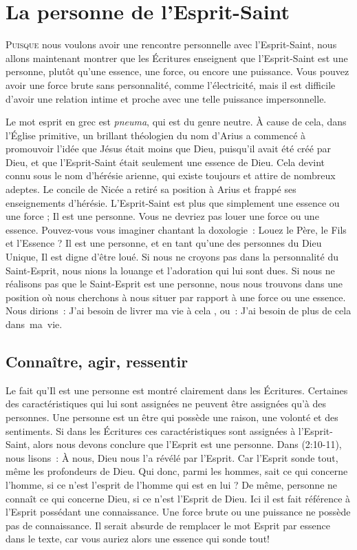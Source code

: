 \chapter{La personne de l'Esprit-Saint}

\lettrine{P}{uisque} nous voulons avoir une rencontre personnelle avec
 l'Esprit-Saint, nous allons maintenant montrer que les Écritures enseignent
 que l'Esprit-Saint est une personne, plutôt qu'une essence, une force, ou
 encore une puissance. Vous pouvez avoir une force brute sans personnalité,
 comme l'électricité, mais il est difficile d'avoir une relation intime et
 proche avec une telle puissance impersonnelle.

Le mot \og esprit \fg{} en grec est \emph{pneuma}, qui est du genre neutre.
 À cause de cela, dans l'Église primitive, un brillant théologien du nom
 d'Arius a commencé à promouvoir l'idée que Jésus était moins que Dieu,
 puisqu'il avait été créé par Dieu, et que l'Esprit-Saint était seulement
 une \og essence \fg{} de Dieu. Cela devint connu sous le nom d'hérésie
 arienne, qui existe toujours et attire de nombreux adeptes. Le concile de
 Nicée a retiré sa position à Arius et frappé ses enseignements d'hérésie.
 L'Esprit-Saint est plus que simplement une essence ou une force ; Il est
 une personne. Vous ne devriez pas louer une force ou une essence.
 Pouvez-vous vous imaginer chantant la doxologie~:
 \og Louez le Père, le Fils et l'Essence \fg{} ?
 Il est une personne, et en tant qu'une des personnes
 du Dieu Unique, Il est digne d'être loué. Si nous ne croyons pas dans la
 personnalité du Saint-Esprit, nous nions la louange et l'adoration qui lui
 sont dues. Si nous ne réalisons pas que le Saint-Esprit est une personne,
 nous nous trouvons dans une position où nous cherchons à nous situer par
 rapport à une force ou une essence. Nous dirions~: \og J'ai besoin de livrer
 ma vie à cela \fg{}, ou~: \og J'ai besoin de plus de cela dans~ma~vie.\fg


\section{Conna\^itre, agir, ressentir}

Le fait qu'Il est une personne est montré clairement dans les Écritures.
 Certaines des caractéristiques qui lui sont assignées ne peuvent être assignées
 qu'à des personnes. Une personne est un être qui possède une raison,
 une volonté et des sentiments.
 Si dans les Écritures ces caractéristiques sont assignées à
 l'Esprit-Saint, alors nous devons conclure que l'Esprit est une personne.
 Dans (2:10-11), nous lisons~: \og À nous, Dieu nous l'a
 révélé par l'Esprit. Car l'Esprit sonde tout, même les profondeurs de Dieu.
 Qui donc, parmi les hommes, sait ce qui concerne l'homme, si ce n'est
 l'esprit de l'homme qui est en lui ? De même, personne ne connaît ce qui
 concerne Dieu, si ce n'est l'Esprit de Dieu. \fg{} Ici il est fait référence
 à l'Esprit possédant une connaissance. Une force brute ou une puissance ne
 possède pas de connaissance. Il serait absurde de remplacer le mot
 \og Esprit \fg{} par \og essence \fg{} dans le texte, car vous auriez alors
 une \og essence \fg{} qui sonde tout!

